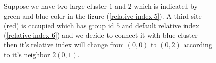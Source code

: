 	\begin{figure}
	\centering
	\caption{Suppose we have two large cluster $1$ and $2$ which is indicated by green and blue color in the figure (\ref{relative-index-5}). A third site (red) is occupied which has group id $5$ and default relative index (\ref{relative-index-6}) and we decide to connect it with blue cluster then it's relative index will change from $(0,0)$ to $(0,2)$ according to it's neighbor $2(0,1)$.
	}
	\label{fig:relative-index-2}
\end{figure}
